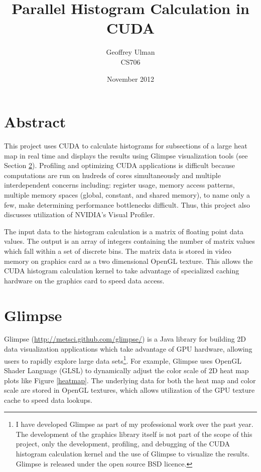 \documentclass{article}
\begin{document}
\title{Parallel Histogram Calculation in CUDA}
\author{Geoffrey Ulman\\
        CS706}
\date{November 2012}
\maketitle

\section{Abstract}\label{abstract}

This project uses CUDA to calculate histograms for subsections of a large heat map in real time and displays the results using Glimpse visualization tools (see Section \ref{glimpse}). Profiling and optimizing CUDA applications is difficult because computations are run on hudreds of cores simultaneously and multiple interdependent concerns including: register usage, memory access patterns, multiple memory spaces (global, constant, and shared memory), to name only a few, make determining performance bottlenecks difficult. Thus, this project also discusses utilization of NVIDIA's Visual Profiler\cite{nvidia-visual-profiler}.

The input data to the histogram calculation is a matrix of floating point data values. The output is an array of integers containing the number of matrix values which fall within a set of discrete bins. The matrix data is stored in video memory on graphics card as a two dimensional OpenGL texture. This allows the CUDA histogram calculation kernel to take advantage of specialized caching hardware on the graphics card to speed data access.

\section{Glimpse}\label{glimpse}

Glimpse (\url{http://metsci.github.com/glimpse/}) is a Java library for building 2D data visualization applications which take advantage of GPU hardware, allowing users to rapidly explore large data sets\footnote{I have developed Glimpse as part of my professional work over the past year. The development of the graphics library itself is not part of the scope of this project, only the development, profiling, and debugging of the CUDA histogram calculation kernel and the use of Glimpse to visualize the results. Glimpse is released under the open source BSD licence.}. For example, Glimpse uses OpenGL Shader Language (GLSL) to dynamically adjust the color scale of 2D heat map plots like Figure \ref{heatmap}. The underlying data for both the heat map and color scale are stored in OpenGL textures, which allows utilization of the GPU texture cache to speed data lookups.
\end{document}
